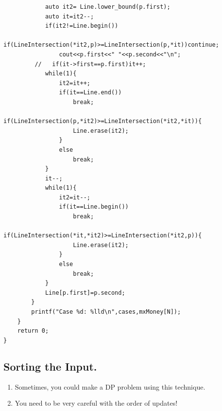 \documentclass[12pt]{book}
\begin{document}
\begin{verbatim}
            auto it2= Line.lower_bound(p.first);
            auto it=it2--;
            if(it2!=Line.begin())
            if(LineIntersection(*it2,p)>=LineIntersection(p,*it))continue;
                cout<<p.first<<" "<<p.second<<"\n";
         //   if(it->first==p.first)it++;
            while(1){
                it2=it++;
                if(it==Line.end())
                    break;
                if(LineIntersection(p,*it2)>=LineIntersection(*it2,*it)){
                    Line.erase(it2);
                }
                else
                    break;
            }
            it--;
            while(1){
                it2=it--;
                if(it==Line.begin())
                    break;
                if(LineIntersection(*it,*it2)>=LineIntersection(*it2,p)){
                    Line.erase(it2);
                }
                else
                    break;
            }
            Line[p.first]=p.second;
        }
        printf("Case %d: %lld\n",cases,mxMoney[N]);
    }
    return 0;
}
\end{verbatim}
\subsection{Sorting the Input.}
\begin{enumerate}[label = \roman*.]
\item Sometimes, you could make a DP problem using this technique.
\item You need to be very careful with the order of updates!
\end{enumerate}
\end{document}
